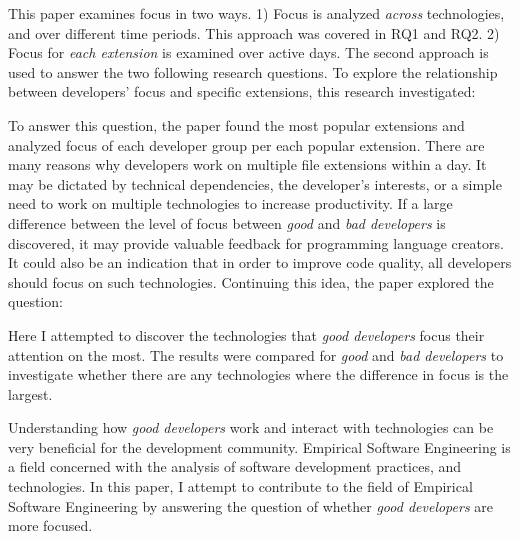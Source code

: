 \vspace{5mm}
\noindent{}
\vspace{2mm}

This paper examines focus in two ways. 1) Focus is analyzed \textit{across} technologies, and over different time periods. This approach was covered in RQ1 and RQ2. 2) Focus for \textit{each extension} is examined over active days. The second approach is used to answer the two following research questions. To explore the relationship between developers’ focus and specific extensions, this research investigated: \par

\vspace{5mm}
\noindent{}
\vspace{2mm}

To answer this question, the paper found the most popular extensions and analyzed focus of each developer group per each popular extension. There are many reasons why developers work on multiple file extensions within a day. It may be dictated by technical dependencies, the developer’s interests, or a simple need to work on multiple technologies to increase productivity. If a large difference between the level of focus between \textit{good} and \textit{bad developers} is discovered, it may provide valuable feedback for programming language creators. It could also be an indication that in order to improve code quality, all developers should focus on such technologies. Continuing this idea, the paper explored the question: \par

\vspace{5mm}
\noindent{}
\vspace{2mm}

Here I attempted to discover the technologies that \textit{good developers} focus their attention on the most. The results were compared for \textit{good} and \textit{bad developers} to investigate whether there are any technologies where the difference in focus is the largest. \par

Understanding how \textit{good developers} work and interact with technologies can be very beneficial for the development community. Empirical Software Engineering is a field concerned with the analysis of  software development practices, and technologies. In this paper, I attempt to contribute to the field of Empirical Software Engineering by answering the question of whether \textit{good developers} are more focused.
% 
% 


